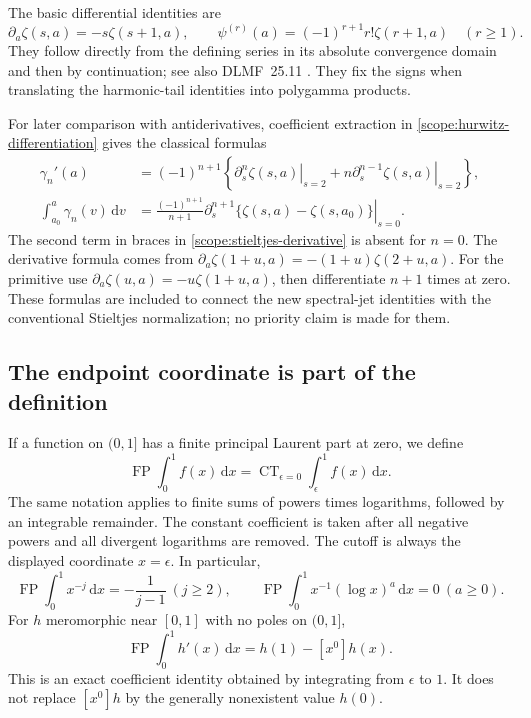 \documentclass[11pt,a4paper]{article}
\numberwithin{equation}{section}
\theoremstyle{definition}
\theoremstyle{remark}
\DeclareMathOperator{\FP}{FP}
\DeclareMathOperator{\CT}{CT}
\newcommand{\dd}{\,\mathrm d}
\begin{document}
The basic differential identities are
\begin{equation}\label{scope:hurwitz-differentiation}
 \partial_a\zeta(s,a)=-s\zeta(s+1,a),\qquad
 \psi^{(r)}(a)=(-1)^{r+1}r!\zeta(r+1,a)\quad(r\ge1).
\end{equation}
They follow directly from the defining series in its absolute
convergence domain and then by continuation; see also DLMF~25.11
\cite{DLMF}.  They fix the signs when translating the harmonic-tail
identities into polygamma products.

For later comparison with antiderivatives, coefficient extraction in
\eqref{scope:hurwitz-differentiation} gives the classical formulas
\begin{align}
 \gamma_n'(a)
  &=(-1)^{n+1}
     \left\{\left.\partial_s^n\zeta(s,a)\right|_{s=2}
      +n\left.\partial_s^{n-1}\zeta(s,a)\right|_{s=2}\right\},
       \label{scope:stieltjes-derivative}\\
 \int_{a_0}^{a}\gamma_n(v)\dd v
  &=\frac{(-1)^{n+1}}{n+1}
    \left.\partial_s^{n+1}
       \{\zeta(s,a)-\zeta(s,a_0)\}\right|_{s=0}.
       \label{scope:stieltjes-primitive}
\end{align}
The second term in braces in \eqref{scope:stieltjes-derivative} is
absent for $n=0$.  The derivative formula comes from
$\partial_a\zeta(1+u,a)=-(1+u)\zeta(2+u,a)$.
For the primitive use
$\partial_a\zeta(u,a)=-u\zeta(1+u,a)$, then differentiate
$n+1$ times at zero.  These formulas are included to connect the new
spectral-jet identities with the conventional Stieltjes normalization;
no priority claim is made for them.

\subsection{The endpoint coordinate is part of the definition}

If a function on $(0,1]$ has a finite principal Laurent part at zero,
we define
\begin{equation}\label{scope:finitepart}
 \FP\int_0^1 f(x)\dd x
   =\CT_{\epsilon=0}\int_\epsilon^1 f(x)\dd x.
\end{equation}
The same notation applies to finite sums of powers times logarithms,
followed by an integrable remainder.  The constant coefficient is taken
after all negative powers and all divergent logarithms are removed.
The cutoff is always the displayed coordinate $x=\epsilon$.
In particular,
\[
 \FP\int_0^1x^{-j}\dd x=-\frac1{j-1}\ (j\ge2),\qquad
 \FP\int_0^1x^{-1}(\log x)^a\dd x=0\ (a\ge0).
\]
For $h$ meromorphic near $[0,1]$ with no poles on $(0,1]$,
\begin{equation}\label{scope:boundary}
 \FP\int_0^1h'(x)\dd x=h(1)-[x^0]h(x).
\end{equation}
This is an exact coefficient identity obtained by integrating from
$\epsilon$ to $1$.  It does not replace $[x^0]h$ by the generally
nonexistent value $h(0)$.
\end{document}
